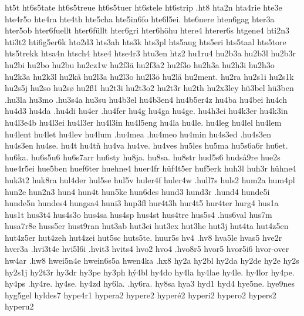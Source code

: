 ht5t
ht6s5tate
ht6s5treue
ht6s5tuer
ht6stele
ht6strip
.ht8
hta2n
hta4rie
hte3e
hte4r5o
hte4ra
hte4th
hte5cha
hte5in6fo
hte6l5ei.
hte6nere
hten6gag
hter3a
hter5ob
hter6fuellt
hter6füllt
hter6gri
hter6höhu
htere4
hterer6s
htgene4
hti2n3
hti3t2
hti6g5er6k
hto2d3
hts3ah
hts3k
hts3pl
hts5aug
hts5eri
hts5taal
hts5tore
hts5trekk
htsa4n
htsch4
htse4
htse4r3
htu3en
htz2
hu1ru4
hu2b3a
hu2b3l
hu2b3r
hu2bi
hu2bo
hu2bu
hu2cz1w
hu2f3ä
hu2f3a2
hu2f3o
hu2h3a
hu2h3i
hu2h3o
hu2k3a
hu2k3l
hu2kä
hu2l3a
hu2l3o
hu2l3ö
hu2lä
hu2ment.
hu2ra
hu2s1i
hu2s1k
hu2s5j
hu2so
hu2sø
hu2ß1
hu2t3i
hu2t3o2
hu2t3r
hu2th
hu2x3ley
hü3bel
hü3ben
.hu3la
hu3mo
.hu3s4a
hu3su
hu4b3el
hu4b3en4
hu4b5er4z
hu4ba
hu4bei
hu4ch
hu4d3
hu4da
.hu4di
hu4er
.hu4fer
hu4g
hu4ga
hu4ge.
hu4h3ei
hu4k3er
hu4k3in
hu4l3e4b
hu4l3ei
hu4l3er
hu4l3in
hu4l5eng
hu4la
hu4le.
hu4leg
hu4lel
hu4lem
hu4lent
hu4let
hu4lev
hu4lum
.hu4mea
.hu4meo
hu4min
hu4s3ed
.hu4s3en
hu4s3en
hu4se.
hu4t
hu4tň
hu4va
hu4ve.
hu4ves
hu5les
hu5ma
hu5s6a6r
hu6et.
hu6ka.
hu6s5u6
hu6s7arr
hu6sty
hu8ja.
hu8sa.
hu8str
hud5s6
hudså9re
hue2s
hue4r5ei
hue5ben
huef6ter
huehne4
huer4fr
hüf4t5er
huf5erk
huh3l
huh3r
hühne4
huk3t2
huk8ra
hul4der
hul5se
hul5v
huler4f
huler4w
.hull7s
huls2
hum2a
hum4pl
hun2e
hun2n3
hun4
hun4t
hun5ke
hun6des
hund3
hund3r
.hund4
hunde5i
hunde5n
hundes4
hungsa4
huni3
hup3fl
hur4t3h
hur4t5
hur4ter
hurg4
hus1a
hus1t
hus3t4
hus4s3o
hus4sa
hus4sp
hus4st
hus4tre
hus5s4
.hus6val
hus7m
husa7r8e
huss5er
hust9ran
hut3ab
hut3ei
hut3ex
hut3he
hut3j
hut4ta
hut4z5en
hut4z5er
hut4zeh
hut4zei
hut5sc
huts5te.
huur5s
hv4
.hv8
hva5le
hvas5
hve2r
hver3a
.hvi3t4e
hvi5l6i
.hvit3
hvits4
hvo2
hvo4
.hvo8r5
hvor5
hvor5i6
hvor-over
hw4ar
.hw8
hwei5n4e
hwein6s5a
hwen4ka
.hx8
hy2a
hy2bl
hy2da
hy2de
hy2e
hy2s
hy2s1j
hy2t3r
hy3dr
hy3pe
hy3ph
hý4bl
hy4do
hy4la
hy4lae
hy4le.
hy4lor
hy4pe.
hy4ps
.hy4re.
hy4se.
hy4zd
hy6la.
.hy6ra.
hy8sa
hya3
hyd1
hyd4
hye5ne.
hye9nes
hyg5gel
hyldes7
hype4r1
hypera2
hypere2
hyperé2
hyperi2
hypero2
hypers2
hyperu2
